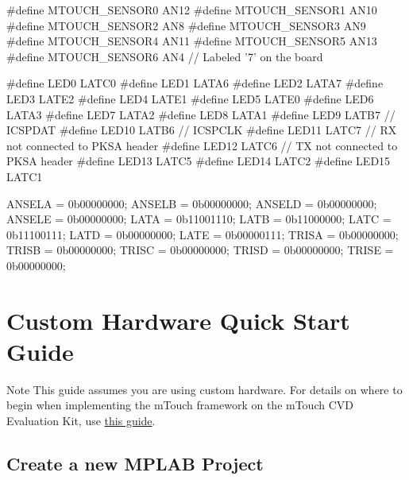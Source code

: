\begin{DoxyCode}
\textcolor{preprocessor}{#define MTOUCH\_SENSOR0              AN12         }
\textcolor{preprocessor}{#define MTOUCH\_SENSOR1              AN10         }
\textcolor{preprocessor}{#define MTOUCH\_SENSOR2              AN8    }
\textcolor{preprocessor}{#define MTOUCH\_SENSOR3              AN9  }
\textcolor{preprocessor}{#define MTOUCH\_SENSOR4              AN11}
\textcolor{preprocessor}{#define MTOUCH\_SENSOR5              AN13}
\textcolor{preprocessor}{#define MTOUCH\_SENSOR6              AN4     // Labeled '7' on the board}

\textcolor{preprocessor}{#define LED0  LATC0}
\textcolor{preprocessor}{#define LED1  LATA6}
\textcolor{preprocessor}{#define LED2  LATA7}
\textcolor{preprocessor}{#define LED3  LATE2}
\textcolor{preprocessor}{#define LED4  LATE1}
\textcolor{preprocessor}{#define LED5  LATE0}
\textcolor{preprocessor}{#define LED6  LATA3}
\textcolor{preprocessor}{#define LED7  LATA2}
\textcolor{preprocessor}{#define LED8  LATA1}
\textcolor{preprocessor}{#define LED9  LATB7     // ICSPDAT}
\textcolor{preprocessor}{#define LED10 LATB6     // ICSPCLK}
\textcolor{preprocessor}{#define LED11 LATC7     // RX not connected to PKSA header}
\textcolor{preprocessor}{#define LED12 LATC6     // TX not connected to PKSA header}
\textcolor{preprocessor}{#define LED13 LATC5}
\textcolor{preprocessor}{#define LED14 LATC2}
\textcolor{preprocessor}{#define LED15 LATC1}

ANSELA  = 0b00000000;
ANSELB  = 0b00000000;
ANSELD  = 0b00000000;
ANSELE  = 0b00000000;
LATA    = 0b11001110;
LATB    = 0b11000000;
LATC    = 0b11100111;
LATD    = 0b00000000;
LATE    = 0b00000111;
TRISA   = 0b00000000;
TRISB   = 0b00000000;
TRISC   = 0b00000000;
TRISD   = 0b00000000;
TRISE   = 0b00000000;
\end{DoxyCode}
 \hypertarget{GettingStartedCustom}{}\section{Custom Hardware Quick Start Guide}\label{GettingStartedCustom}
\begin{DoxyNote}{Note}
This guide assumes you are using custom hardware. For details on where to begin when implementing the m\+Touch framework on the m\+Touch C\+V\+D Evaluation Kit, use \hyperlink{GettingStartedEval}{this guide}.
\end{DoxyNote}
\hypertarget{_getting_started_custom_GS_C_NewProject}{}\subsection{Create a new M\+P\+L\+A\+B Project}\label{_getting_started_custom_GS_C_NewProject}
